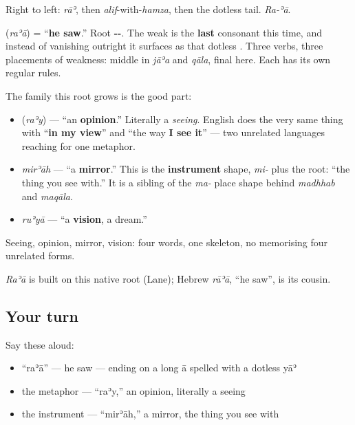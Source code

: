 Right to left: \emph{rāʾ}, then \emph{alif}-with-\emph{hamza}, then the dotless tail. \emph{Ra-ʾā}.

\begin{cousinweb}
\textbf{} (\emph{raʾā}) = \textquotedblleft{}\textbf{he saw}.\textquotedblright{} Root \textbf{--}. The weak \textbf{} is the \textbf{last} consonant this time, and instead of vanishing outright it surfaces as that dotless \textbf{}. Three verbs, three placements of weakness: middle in \emph{jāʾa} and \emph{qāla}, final here. Each has its own regular rules.

The family this root grows is the good part:

\begin{itemize}
\raggedright
  \item \textbf{} (\emph{raʾy}) — \textquotedblleft{}an \textbf{opinion}.\textquotedblright{} Literally a \emph{seeing}. English does the very same thing with \textquotedblleft{}\textbf{in my view}\textquotedblright{} and \textquotedblleft{}the way \textbf{I see it}\textquotedblright{} — two unrelated languages reaching for one metaphor.
  \item \emph{mirʾāh} — \textquotedblleft{}a \textbf{mirror}.\textquotedblright{} This is the \textbf{instrument} shape, \emph{mi-} plus the root: \textquotedblleft{}the thing you see with.\textquotedblright{} It is a sibling of the \emph{ma-} place shape behind \emph{madhhab} and \emph{maqāla}.
  \item \emph{ruʾyā} — \textquotedblleft{}a \textbf{vision}, a dream.\textquotedblright{}
\end{itemize}

Seeing, opinion, mirror, vision: four words, one skeleton, no memorising four unrelated forms.

\emph{Raʾā} is built on this native root (Lane); Hebrew \emph{rāʾā}, \textquotedblleft{}he saw\textquotedblright{}, is its cousin.
\end{cousinweb}

\subsection*{Your turn}
Say these aloud:

\begin{itemize}
\raggedright
  \item \textquotedblleft{}raʾā\textquotedblright{} — he saw — ending on a long ā spelled with a dotless yāʾ
  \item the metaphor — \textquotedblleft{}raʾy,\textquotedblright{} an opinion, literally a seeing
  \item the instrument — \textquotedblleft{}mirʾāh,\textquotedblright{} a mirror, the thing you see with
\end{itemize}

